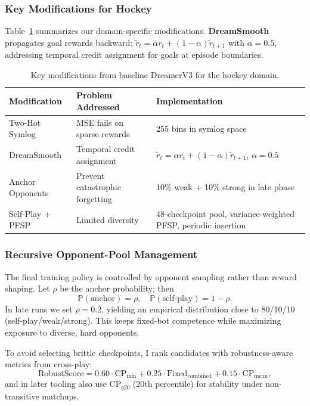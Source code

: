 \documentclass[11pt]{article}
\begin{document}
\subsubsection{Key Modifications for Hockey}

Table~\ref{tab:modifications} summarizes our domain-specific modifications. \textbf{DreamSmooth}~\cite{dreamsmooth2023} propagates goal rewards backward: $\tilde{r}_t = \alpha r_t + (1-\alpha)\tilde{r}_{t+1}$ with $\alpha = 0.5$, addressing temporal credit assignment for goals at episode boundaries.

\begin{table}[h]
\centering
\small
\begin{tabular}{lp{4.2cm}p{4.8cm}}
\toprule
\textbf{Modification} & \textbf{Problem Addressed} & \textbf{Implementation} \\
\midrule
Two-Hot Symlog & MSE fails on sparse rewards & 255 bins in symlog space \\
DreamSmooth & Temporal credit assignment & $\tilde{r}_t = \alpha r_t + (1-\alpha)\tilde{r}_{t+1}$, $\alpha=0.5$ \\
Anchor Opponents & Prevent catastrophic forgetting & 10\% weak + 10\% strong in late phase \\
Self-Play + PFSP & Limited diversity & 48-checkpoint pool, variance-weighted PFSP, periodic insertion \\
\bottomrule
\end{tabular}
\caption{Key modifications from baseline DreamerV3 for the hockey domain.}
\label{tab:modifications}
\end{table}

\subsubsection{Recursive Opponent-Pool Management}

The final training policy is controlled by opponent sampling rather than reward shaping. Let $\rho$ be the anchor probability; then
\[
\mathbb{P}(\text{anchor})=\rho,\quad \mathbb{P}(\text{self-play})=1-\rho.
\]
In late runs we set $\rho=0.2$, yielding an empirical distribution close to 80/10/10 (self-play/weak/strong). This keeps fixed-bot competence while maximizing exposure to diverse, hard opponents.

To avoid selecting brittle checkpoints, I rank candidates with robustness-aware metrics from cross-play:
\[
\text{RobustScore}=0.60\cdot \text{CP}_{\min}+0.25\cdot \text{Fixed}_{\text{combined}}+0.15\cdot \text{CP}_{\text{mean}},
\]
and in later tooling also use $\text{CP}_{q20}$ (20th percentile) for stability under non-transitive matchups.
\end{document}
